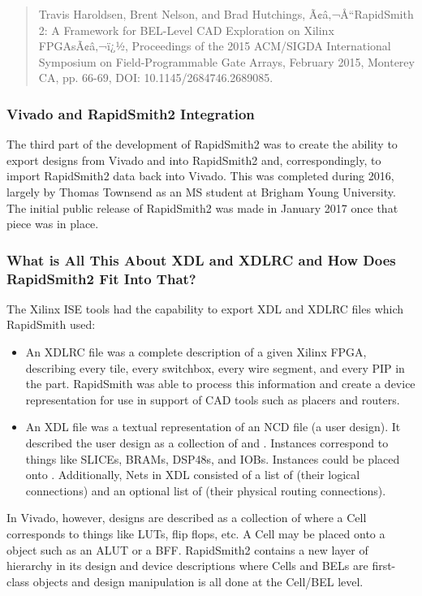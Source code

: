 \begin{quotation}Travis Haroldsen, Brent Nelson, and Brad Hutchings, Ã¢â‚¬Å“RapidSmith
2:
A Framework for BEL-Level CAD Exploration on Xilinx FPGAsÃ¢â‚¬ï¿½, Proceedings of the
2015 ACM/SIGDA International Symposium on Field-Programmable Gate Arrays,
February 2015, Monterey CA, pp. 66-69, DOI: 10.1145/2684746.2689085.
\end{quotation}

\subsubsection{Vivado and RapidSmith2 Integration}
The third part of the development of RapidSmith2 was to create the ability to export
designs from Vivado and into RapidSmith2 and, correspondingly, to import RapidSmith2 data back
into Vivado.  This was completed during 2016, largely by Thomas Townsend
as an MS student at Brigham Young University.  The initial
public release of RapidSmith2 was made in January 2017 once that piece was in place.

\subsubsection{What is All This About XDL and XDLRC and How Does RapidSmith2 Fit Into
That?} 
The Xilinx ISE tools had the capability to export XDL and XDLRC files which
RapidSmith used: 
\begin{itemize}
  \item An XDLRC file was a complete description of a given Xilinx FPGA,
  describing every tile, every switchbox, every wire segment, and every PIP in
  the part.  RapidSmith was able to process this information and create a device
  representation for use in support of CAD tools such as placers and routers.
  \item An XDL file was a textual representation of an NCD file (a user design).
  It described the user design as a collection of  and . Instances
  correspond to things like {SLICEs}, {BRAMs}, {DSP48s}, and {IOBs}.  Instances could be
  placed onto . Additionally, Nets in XDL consisted of a list of
   (their logical connections) and an optional list of  (their physical
  routing connections).
\end{itemize}
In Vivado, however, designs are described as a collection of  where a Cell
corresponds to things like LUTs, flip flops, etc.  A Cell may be placed
onto a  object such as an ALUT or a BFF.  RapidSmith2 contains a new layer of
hierarchy in its design and device descriptions where Cells and BELs are first-class objects and
design manipulation is all done at the Cell/BEL level.

